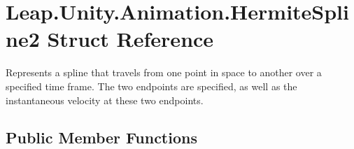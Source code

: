 \hypertarget{struct_leap_1_1_unity_1_1_animation_1_1_hermite_spline2}{}\section{Leap.\+Unity.\+Animation.\+Hermite\+Spline2 Struct Reference}
\label{struct_leap_1_1_unity_1_1_animation_1_1_hermite_spline2}


Represents a spline that travels from one point in space to another over a specified time frame. The two endpoints are specified, as well as the instantaneous velocity at these two endpoints.  


\subsection*{Public Member Functions}
